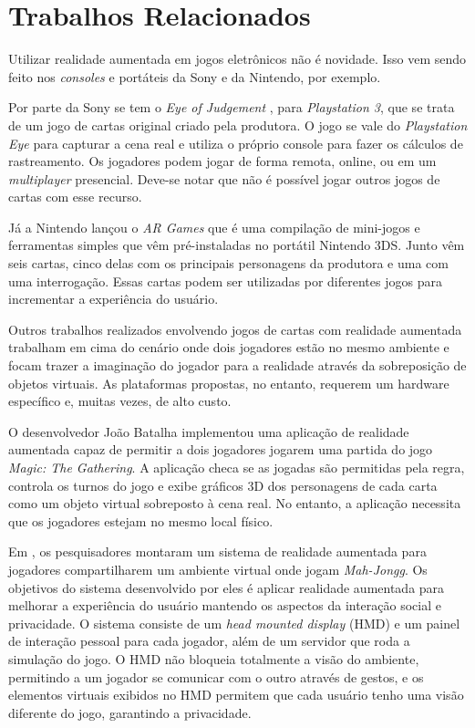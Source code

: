 \documentclass[conference]{IEEEtran}
\begin{document}
\section{Trabalhos Relacionados}
\label{rel}
Utilizar realidade aumentada em jogos eletrônicos não é novidade. Isso vem sendo 
feito nos \textit{consoles} e portáteis da Sony e da Nintendo, por exemplo.

Por parte da Sony se tem o \textit{Eye of Judgement} \cite{eyesony}, para 
\textit{Playstation 3}, que se trata de um jogo de cartas original criado pela 
produtora. O jogo se vale do \textit{Playstation Eye} para capturar a cena real 
e utiliza o próprio console para fazer os cálculos de rastreamento. Os jogadores 
podem jogar de forma remota, online, ou em um \textit{multiplayer} presencial. 
Deve-se notar que não é possível jogar outros jogos de cartas com esse recurso.

Já a Nintendo lançou o \textit{AR Games} \cite{3ds} que é uma compilação de 
mini-jogos e ferramentas simples que vêm pré-instaladas no portátil Nintendo 
3DS. Junto vêm seis cartas, cinco delas com os principais personagens da 
produtora e uma com uma interrogação. Essas cartas podem ser utilizadas por 
diferentes jogos para incrementar a experiência do usuário.

Outros trabalhos realizados envolvendo jogos de cartas com realidade aumentada 
trabalham em cima do cenário onde dois jogadores estão no mesmo ambiente e focam 
trazer a imaginação do jogador para a realidade através da sobreposição de 
objetos virtuais. As plataformas propostas, no entanto, requerem um hardware 
específico e, muitas vezes, de alto custo.

O desenvolvedor João Batalha implementou uma aplicação de realidade aumentada 
capaz de permitir a dois jogadores jogarem uma partida do jogo \textit{Magic: 
The Gathering}. A aplicação checa se as jogadas são permitidas pela regra, 
controla os turnos do jogo e exibe gráficos 3D dos personagens de cada carta 
como um objeto virtual sobreposto à cena real. No entanto, a aplicação necessita 
que os jogadores estejam no mesmo local físico.

Em \cite{Szalavari:1998:CGA:293701.293740}, os pesquisadores montaram um sistema 
de realidade aumentada para jogadores compartilharem um ambiente virtual onde 
jogam \textit{Mah-Jongg}. Os objetivos do sistema desenvolvido por eles é 
aplicar realidade aumentada para melhorar a experiência do usuário mantendo os 
aspectos da interação social e privacidade. O sistema consiste de um 
\textit{head mounted display} (HMD) e um painel de interação pessoal para cada 
jogador, além de um servidor que roda a simulação do jogo. O HMD não bloqueia 
totalmente a visão do ambiente, permitindo a um jogador se comunicar com o outro 
através de gestos, e os elementos virtuais exibidos no HMD permitem que cada 
usuário tenho uma visão diferente do jogo, garantindo a privacidade.
\end{document}
